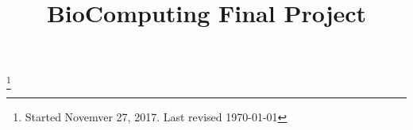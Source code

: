 \documentclass[reqno, 11pt]{amsart}
\theoremstyle{definition}
\numberwithin{equation}{section}
\begin{document}
\title{BioComputing Final Project}
\thanks{Started Novemver 27, 2017. Last revised \today}

\maketitle
\end{document}
